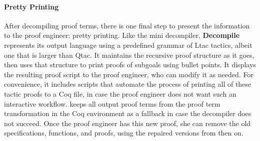\paragraph{Pretty Printing}
After decompiling proof terms, there is one final step to present the information to the proof engineer: pretty printing.
Like the mini decompiler, \textbf{Decompile} represents its output language using a predefined grammar of Ltac tactics,
albeit one that is larger than Qtac.
It maintains the recursive proof structure as it goes, then uses that structure to print proofs of subgoals using bullet points.
It displays the resulting proof script to the proof engineer, who can modify it as needed.
For convenience, it includes scripts that automate the process of printing all of these tactic proofs to a Coq file,
in case the proof engineer does not want such an interactive workflow.
\toolname keeps all output proof terms from the proof term transformation in the Coq environment as a fallback in case the decompiler does not succeed.
Once the proof engineer has this new proof, she can remove the old specifications, functions, and proofs, using the repaired
versions from then on.


